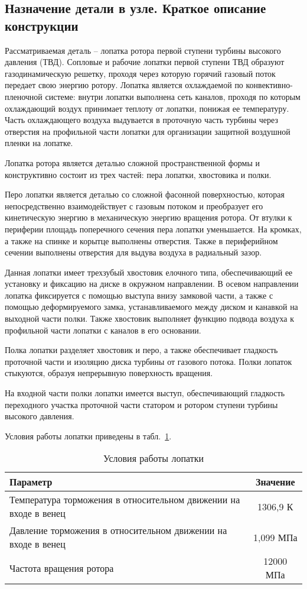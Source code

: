 \subsection{Назначение детали в узле. Краткое описание конструкции}
Рассматриваемая деталь – лопатка ротора первой ступени турбины высокого давления (ТВД). Сопловые и рабочие лопатки первой
ступени ТВД образуют газодинамическую решетку, проходя через которую горячий газовый поток передает свою энергию ротору.
Лопатка является охлаждаемой по конвективно-пленочной системе: внутри лопатки выполнена сеть каналов, проходя по которым
охлаждающий воздух принимает теплоту от лопатки, понижая ее температуру. Часть охлаждающего воздуха выдувается в проточную
часть турбины через отверстия на профильной части лопатки для организации защитной воздушной пленки на лопатке.

Лопатка ротора является деталью сложной пространственной формы и конструктивно состоит из трех частей: пера лопатки, хвостовика и полки.

Перо лопатки является деталью со сложной фасонной поверхностью, которая непосредственно взаимодействует с газовым потоком
и преобразует его кинетическую энергию в механическую энергию вращения ротора. От втулки к периферии площадь поперечного
сечения пера лопатки уменьшается. На кромках, а также на спинке и корытце выполнены отверстия. Также в периферийном сечении
выполнены отверстия для выдува воздуха в радиальный зазор.

Данная лопатки имеет трехзубый хвостовик елочного типа, обеспечивающий ее установку и фиксацию на диске в окружном направлении.
В осевом направлении лопатка фиксируется с помощью выступа внизу замковой части, а также с помощью деформируемого замка,
устанавливаемого между диском и канавкой на выходной части полки. Также хвостовик выполняет функцию подвода воздуха к
профильной части лопатки с каналов в его основании.

Полка лопатки разделяет хвостовик и перо, а также обеспечивает гладкость проточной части и изоляцию диска турбины от газового
потока. Полки лопаток стыкуются, образуя непрерывную поверхность вращения.

На входной части полки лопатки имеется выступ, обеспечивающий гладкость переходного участка проточной части статором и
ротором ступени турбины высокого давления.

Условия работы лопатки приведены в табл.~\ref{tab:technology-env-parameters}.
\begin{longtable}{|p{12cm}|c|}
	\caption{Условия работы лопатки} \label{tab:technology-env-parameters}
	\hline
	\textbf{Параметр} & \textbf{Значение} \\ \hline
	\endhead
	Температура торможения в относительном движении на входе в венец & 1306,9 К \\ \hline
	Давление торможения в относительном движении на входе в венец & 1,099 МПа \\ \hline
	Частота вращения ротора & 12000 МПа \\ \hline
\end{longtable}

